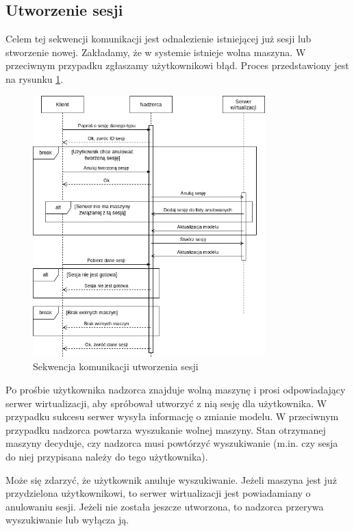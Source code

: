 \documentclass[../opis-rozwiazania.tex]{subfiles}
\begin{document}
\label{communication-sec}

\subsection{Utworzenie sesji}

Celem tej sekwencji komunikacji jest odnalezienie istniejącej już sesji lub stworzenie nowej.
Zakładamy, że w systemie istnieje wolna maszyna.
W przeciwnym przypadku zgłaszamy użytkownikowi błąd. Proces przedstawiony jest na rysunku \ref{figure:diagrams:sequence_diagrams:tworzenie_sesji}.

\begin{figure}[ht!]
  \centering
  \includegraphics[width=0.8\textwidth]{../diagrams/sequence_diagrams/tworzenie_sesji.png}
  \caption{Sekwencja komunikacji utworzenia sesji}
  \label{figure:diagrams:sequence_diagrams:tworzenie_sesji}
\end{figure}

Po prośbie użytkownika nadzorca znajduje wolną maszynę i prosi odpowiadający serwer wirtualizacji, aby spróbował utworzyć z nią sesję dla użytkownika.
W przypadku sukcesu serwer wysyła informację o zmianie modelu.
W przeciwnym przypadku nadzorca powtarza wyszukanie wolnej maszyny.
Stan otrzymanej maszyny decyduje, czy nadzorca musi powtórzyć wyszukiwanie (m.in. czy sesja do niej przypisana należy do tego użytkownika).

Może się zdarzyć, że użytkownik anuluje wyszukiwanie.
Jeżeli maszyna jest już przydzielona użytkownikowi, to serwer wirtualizacji jest powiadamiany o anulowaniu sesji.
Jeżeli nie została jeszcze utworzona, to nadzorca przerywa wyszukiwanie lub wyłącza ją.
\end{document}
